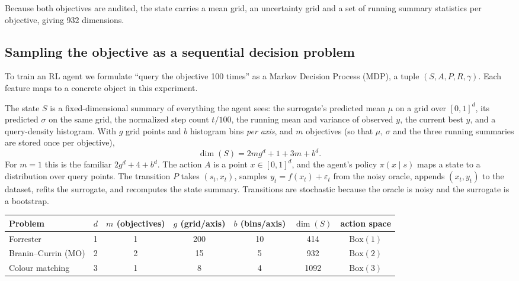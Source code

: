 \documentclass[11pt]{article}
\begin{document}
Because both objectives are audited, the state carries a mean grid, an uncertainty grid and a set of running summary statistics per objective, giving 932 dimensions.

\subsection{Sampling the objective as a sequential decision problem}

To train an RL agent we formulate ``query the objective 100 times'' as a Markov Decision Process (MDP), a tuple $(S, A, P, R, \gamma)$. Each feature maps to a concrete object in this experiment.

The state $S$ is a fixed-dimensional summary of everything the agent sees: the surrogate's predicted mean $\mu$ on a grid over $[0,1]^d$, its predicted $\sigma$ on the same grid, the normalized step count $t/100$, the running mean and variance of observed $y$, the current best $y$, and a query-density histogram. With $g$ grid points and $b$ histogram bins \emph{per axis}, and $m$ objectives (so that $\mu$, $\sigma$ and the three running summaries are stored once per objective),
\[
\dim(S) = 2mg^{d} + 1 + 3m + b^{d}.
\]
For $m = 1$ this is the familiar $2g^d + 4 + b^d$.
The action $A$ is a point $x \in [0,1]^d$, and the agent's policy $\pi(x \mid s)$ maps a state to a distribution over query points. The transition $P$ takes $(s_t, x_t)$, samples $y_t = f(x_t) + \varepsilon_t$ from the noisy oracle, appends $(x_t, y_t)$ to the dataset, refits the surrogate, and recomputes the state summary. Transitions are stochastic because the oracle is noisy and the surrogate is a bootstrap.

\begin{center}
\small
\begin{tabular}{lcccccc}
\toprule
Problem & $d$ & $m$ (objectives) & $g$ (grid/axis) & $b$ (bins/axis) & $\dim(S)$ & action space \\
\midrule
Forrester            & 1 & 1 & 200 & 10 & 414  & $\mathrm{Box}(1)$ \\
Branin--Currin (MO)  & 2 & 2 & 15  & 5  & 932  & $\mathrm{Box}(2)$ \\
Colour matching      & 3 & 1 & 8   & 4  & 1092 & $\mathrm{Box}(3)$ \\
\bottomrule
\end{tabular}
\end{center}
\end{document}
